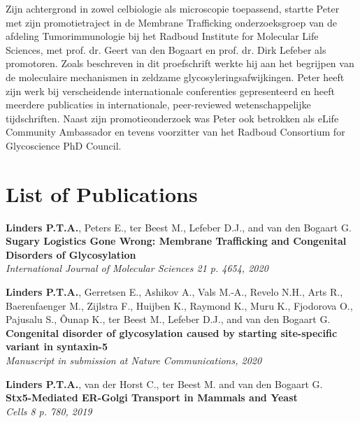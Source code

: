 Zijn achtergrond in zowel celbiologie als microscopie toepassend, startte Peter met zijn promotietraject in de Membrane Trafficking onderzoeksgroep van de afdeling Tumorimmunologie bij het Radboud Institute for Molecular Life Sciences, met prof. dr. Geert van den Bogaart en prof. dr. Dirk Lefeber als promotoren. Zoals beschreven in dit proefschrift werkte hij aan het begrijpen van de moleculaire mechanismen in zeldzame glycosyleringsafwijkingen. Peter heeft zijn werk bij verscheidende internationale conferenties gepresenteerd en heeft meerdere publicaties in internationale, peer-reviewed wetenschappelijke tijdschriften. Naast zijn promotieonderzoek was Peter ook betrokken als eLife Community Ambassador en tevens voorzitter van het Radboud Consortium for Glycoscience PhD Council.


\clearpage

\section{List of Publications}

\textbf{Linders P.T.A.}, Peters E., ter Beest M., Lefeber D.J., and van den Bogaart G. \\
\textbf{Sugary Logistics Gone Wrong: Membrane Trafficking and Congenital Disorders of Glycosylation} \\
\emph{International Journal of Molecular Sciences 21 p. 4654, 2020}

\vspace{\baselineskip}

\noindent\textbf{Linders P.T.A.}, Gerretsen E., Ashikov A., Vals M.-A., Revelo N.H., Arts R., Baerenfaenger M., Zijlstra F., Huijben K., Raymond K., Muru K., Fjodorova O., Pajusalu S., Õunap K., ter Beest M., Lefeber D.J., and van den Bogaart G. \\
\textbf{Congenital disorder of glycosylation caused by starting site-specific variant in syntaxin-5} \\
\emph{Manuscript in submission at Nature Communications, 2020}

\vspace{\baselineskip}

\noindent\textbf{Linders P.T.A.}, van der Horst C., ter Beest M. and van den Bogaart G. \\
\textbf{Stx5-Mediated ER-Golgi Transport in Mammals and Yeast} \\
\emph{Cells 8 p. 780, 2019}

\vspace{\baselineskip}

